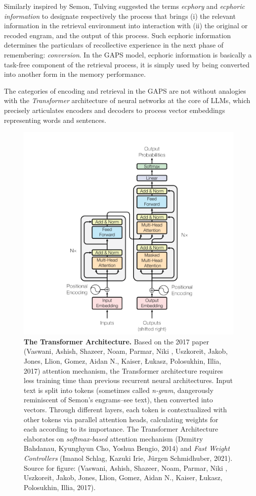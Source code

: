 \documentclass[11pt]{article}
\begin{document}
Similarly inspired by Semon, Tulving suggested the terms \emph{ecphory} and \emph{ecphoric information} to designate respectively the process that brings (i) the relevant information in the retrieval environment into interaction with (ii) the original or recoded engram, and the output of this process. Such ecphoric information determines the particulars of recollective experience in the next phase of remembering: \emph{conversion}. In the GAPS model, ecphoric information is basically a task-free component of the retrieval process, it is simply used by being converted into another form in the memory performance.

The categories of encoding and retrieval in the GAPS are not without analogies with the \emph{Transformer} architecture of neural networks at the core of LLMs, which precisely articulates encoders and decoders to process vector embeddings representing words and sentences.

\begin{figure}[htbp]
\centering
\includegraphics[width=.9\linewidth]{Transformer.png}
\caption{\label{fig:orgbce2a07}\textbf{The Transformer Architecture.} Based on the 2017 paper (Vaswani, Ashish, Shazeer, Noam, Parmar, Niki , Uszkoreit, Jakob, Jones, Llion, Gomez, Aidan N., Kaiser, Łukasz, Polosukhin, Illia, 2017) attention mechanism, the Transformer architecture requires less training time than previous recurrent neural architectures. Input text is split into tokens (sometimes called \emph{n-gram}, dangerously reminiscent of Semon's engrams--see text), then converted into vectors. Through different layers, each token is contextualized with other tokens via parallel attention heads, calculating weights for each according to its importance. The Transformer Architecture elaborates on \emph{softmax-based} attention mechanism (Dzmitry Bahdanau, Kyunghyun Cho, Yoshua Bengio, 2014) and \emph{Fast Weight Controllers} (Imanol Schlag, Kazuki Irie, Jürgen Schmidhuber, 2021). Source for figure: (Vaswani, Ashish, Shazeer, Noam, Parmar, Niki , Uszkoreit, Jakob, Jones, Llion, Gomez, Aidan N., Kaiser, Łukasz, Polosukhin, Illia, 2017).}
\end{figure}
\end{document}
